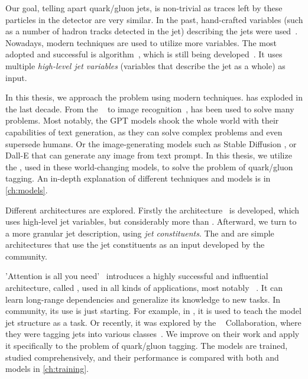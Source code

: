 Our goal, telling apart quark/gluon jets, is non-trivial as traces left by these particles in the detector are very similar.
In the past, hand-crafted variables (such as a number of hadron tracks detected in the jet) describing the jets were used~\cite{ntrk_tag}.
Nowadays, modern \ml techniques are used to utilize more variables.
The most adopted and successful is \bdt algorithm~\cite{bdt}, which is still being developed~\cite{bdt_tag}.
It uses multiple \emph{high-level jet variables} (variables that describe the jet as a whole) as input.

In this thesis, we approach the problem using modern \dl techniques.
\dl has exploded in the last decade.
From the \nlp~\cite{bert} to image recognition~\cite{deit3}, \dl has been used to solve many problems.
Most notably, the GPT \cite{gpt3,gpt4} models shook the whole world with their capabilities of text generation, as they can solve complex problems and even supersede humans. 
Or the image-generating models such as Stable Diffusion \cite{stable_diff}, or Dall-E \cite{dalle} that can generate any image from text prompt. 
In this thesis, we utilize the \dl, used in these world-changing models, to solve the problem of quark/gluon tagging.
An in-depth explanation of different \dl techniques and models is in \cref{ch:models}.

Different architectures are explored.
Firstly the \highway architecture~\cite{highway} is developed, which uses high-level jet variables, but considerably more than \bdt. 
Afterward, we turn to a more granular jet description, using \emph{jet constituents}. 
The \EFN and \PFN \cite{efn} are simple architectures that use the jet constituents as an input developed by the \HEP community.

'Attention is all you need'~\cite{att_is_all} introduces a highly successful and influential architecture, called \trans, used in all kinds of applications, most notably \nlp~\cite{bert,gpt3,gpt4,deit3,cait}.
It can learn long-range dependencies and generalize its knowledge to new tasks.
In \HEP community, its use is just starting.
For example, in \cite{qcd_as_nlp}, it is used to teach the model jet structure as a \nlp task.  
Or recently, it was explored by the \CMS~\cite{cms} Collaboration, where they were tagging jets into various classes~\cite{part}.
We improve on their work and apply it specifically to the problem of quark/gluon tagging.
The models are trained, studied comprehensively, and their performance is compared with both \ml and \dl models in \cref{ch:training}.

